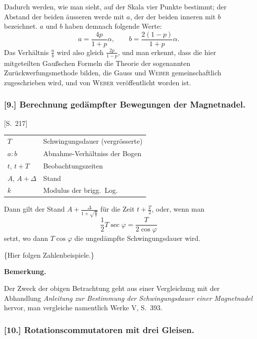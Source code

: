 \documentclass[12pt,a4paper]{article}
\begin{document}
Dadurch werden, wie man sieht, auf der Skala vier Punkte bestimmt; der Abstand der beiden \"ausseren werde mit $a$, der der beiden inneren mit $b$ bezeichnet. $a$ und $b$ haben demnach folgende Werte:
\[
a = \frac{4p}{1+p} \alpha, \qquad b = \frac{2(1-p)}{1+p} \alpha.
\]
Das Verh\"altnis $\frac{a}{b}$ wird also gleich $\frac{2p}{1-p}$, und man erkennt, dass die hier mitgeteilten Gau\ss schen Formeln die Theorie der sogenannten Zur\"uckwerfungsmethode bilden, die Gauss und \textsc{Weber} gemeinschaftlich zugeschrieben wird, und von \textsc{Weber} ver\"offentlicht worden ist.

\subsubsection*{[9.] Berechnung ged\"ampfter Bewegungen der Magnetnadel.}

[S.~217]

\begin{center}
\begin{tabular}{ll}
$T$ & Schwingungsdauer (vergr\"osserte) \\
$a : b$ & Abnahme-Verh\"altniss der Bogen \\
$t$, $t+T$ & Beobachtungszeiten \\
$A$, $A+\Delta$ & Stand \\
$k$ & Modulus der brigg.~Log.
\end{tabular}
\end{center}

Dann gilt der Stand $A + \frac{\Delta}{1+\sqrt{\frac{a}{b}}}$ f\"ur die Zeit $t + \frac{T}{2}$, oder, wenn man
\[
\frac{1}{2} T \sec \varphi = \frac{T}{2\cos\varphi}
\]
setzt, wo dann $T\cos\varphi$ die unged\"ampfte Schwingungsdauer wird.

\medskip\noindent
\{Hier folgen Zahlenbeispiele.\}

\medskip\noindent
\textbf{Bemerkung.}

Der Zweck der obigen Betrachtung geht aus einer Vergleichung mit der Abhandlung \textit{Anleitung zur Bestimmung der Schwingungsdauer einer Magnetnadel} hervor, man vergleiche namentlich Werke V, S.~393.

\subsubsection*{[10.] Rotationscommutatoren mit drei Gleisen.}
\end{document}
